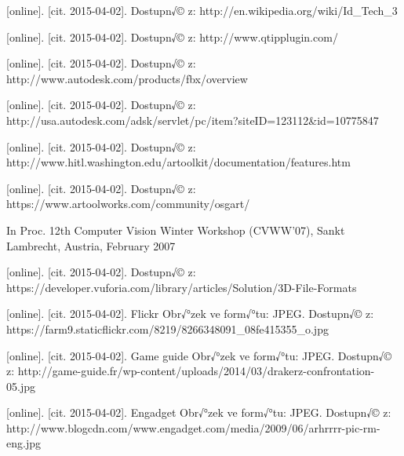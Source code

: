 \documentclass[twoside,12pt]{article}
\begin{document}
\begin{literatura}
{
	 [online]. [cit. 2015-04-02]. Dostupn√© z: http://en.wikipedia.org/wiki/Id\_Tech\_3
}

{
	 [online]. [cit. 2015-04-02]. Dostupn√© z: http://www.qtipplugin.com/
}

{
	 [online]. [cit. 2015-04-02]. Dostupn√© z: http://www.autodesk.com/products/fbx/overview
}

{
	 [online]. [cit. 2015-04-02]. Dostupn√© z: http://usa.autodesk.com/adsk/servlet/pc/item?siteID=123112\&id=10775847
}

{
	 [online]. [cit. 2015-04-02]. Dostupn√© z: http://www.hitl.washington.edu/artoolkit/documentation/features.htm
}

{
	 [online]. [cit. 2015-04-02]. Dostupn√© z: https://www.artoolworks.com/community/osgart/
}

{
In Proc. 12th Computer Vision Winter Workshop (CVWW'07), Sankt Lambrecht, Austria, February 2007
}

{
	 [online]. [cit. 2015-04-02]. Dostupn√© z: https://developer.vuforia.com/library/articles/Solution/3D-File-Formats
}





{
	[online]. [cit. 2015-04-02]. Flickr
	Obr√°zek ve form√°tu: JPEG. Dostupn√© z: https://farm9.staticflickr.com/8219/8266348091\_08fe415355\_o.jpg
}

{
	[online]. [cit. 2015-04-02]. Game guide
	Obr√°zek ve form√°tu: JPEG. Dostupn√© z: http://game-guide.fr/wp-content/uploads/2014/03/drakerz-confrontation-05.jpg
}

{
	[online]. [cit. 2015-04-02]. Engadget
	Obr√°zek ve form√°tu: JPEG. Dostupn√© z: http://www.blogcdn.com/www.engadget.com/media/2009/06/arhrrrr-pic-rm-eng.jpg
}


\end{literatura}
\end{document}
